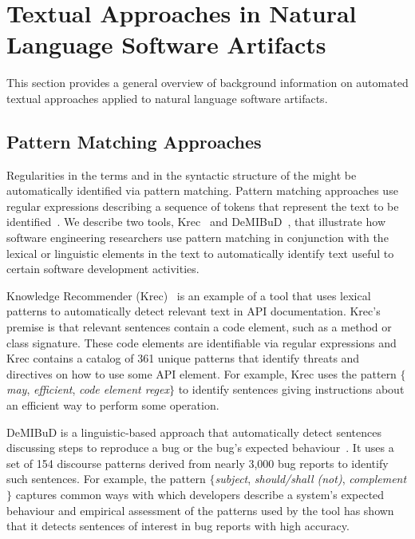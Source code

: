 

\section{Textual Approaches in Natural Language Software Artifacts}
\label{cp2:general-approaches}


This section provides a general overview of 
background information on automated textual approaches
applied to natural language software artifacts. 




\subsection{Pattern Matching Approaches}
\label{cp2:pattern-matching}


Regularities in the terms and in the syntactic structure of the 
might be automatically identified via pattern matching.
Pattern matching approaches use regular expressions describing a sequence of tokens that represent
the text to be identified~\cite{Bavota2016}. 
We describe two tools, Krec~\cite{Robillard2015}  and DeMIBuD~\cite{Chaparro2017}, that
illustrate how software engineering 
researchers use pattern matching in conjunction with the lexical or linguistic elements 
in the text to automatically identify 
text useful to certain software development activities.
    


Knowledge Recommender (Krec)~\cite{Robillard2015} 
is an example of a
 tool that uses lexical patterns to 
 automatically detect relevant text in  API documentation. 
Krec's premise is that relevant sentences contain a code element, such as a method or class signature.
These code elements are identifiable via regular expressions 
and Krec contains a catalog of 361 unique patterns 
that identify threats and directives on how to use some API element.
For example, Krec uses the pattern {\small \textit{$\{$may}, \textit{efficient}, \textit{code element regex$\}$}} 
to identify sentences giving instructions about an efficient way to 
perform some operation. 



{\small DeMIBuD} is a linguistic-based approach that 
automatically detect sentences discussing steps to reproduce 
a bug or the bug's expected behaviour~\cite{Chaparro2017}.
It uses a set of 154 discourse patterns
derived from nearly 3,000 bug reports 
to identify such sentences. 
For example, the pattern 
{\small \textit{$\{$subject}, \textit{should/shall (not)}, \textit{complement$\}$}}
captures common ways with which developers describe a system's expected behaviour
and empirical assessment of the patterns used by the tool has shown that it 
detects sentences of interest in bug reports with high accuracy.







